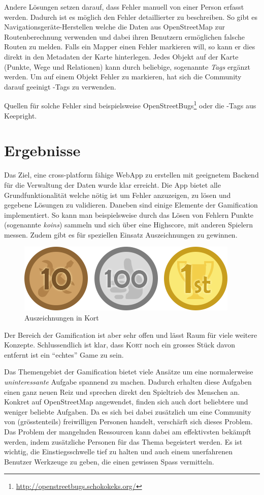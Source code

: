Andere Lösungen setzen darauf, dass Fehler manuell von einer Person erfasst werden. Dadurch ist es möglich den Fehler detaillierter zu beschreiben. 
So gibt es Navigationsgeräte-Herstellen welche die Daten aus OpenStreetMap zur Routenberechnung verwenden und dabei ihren Benutzern ermöglichen falsche Routen zu melden.
Falls ein \gls{Mapper} einen Fehler markieren will, so kann er dies direkt in den Metadaten der Karte hinterlegen. Jedes Objekt auf der Karte (Punkte, Wege und Relationen) kann durch beliebige, sogenannte  \emph{Tags} ergänzt werden.
Um auf einem Objekt Fehler zu markieren, hat sich die Community darauf geeinigt -Tags zu verwenden.

Quellen für solche Fehler sind beispielsweise OpenStreetBugs\footnote{\url{http://openstreetbugs.schokokeks.org/}} oder die -Tags aus Keepright.

\section*{Ergebnisse}
Das Ziel, eine cross-platform fähige \gls{WebApp} zu erstellen mit geeignetem Backend für die Verwaltung der Daten wurde klar erreicht.
Die App bietet alle Grundfunktionalität welche nötig ist um Fehler anzuzeigen, zu lösen und gegebene Lösungen zu validieren.
Daneben sind einige Elemente der Gamification implementiert. So kann man beispielsweise durch das Lösen von Fehlern Punkte (sogenannte \emph{koins}) sammeln und sich über eine Highscore, mit anderen Spielern messen.
Zudem gibt es für speziellen Einsatz Auszeichnungen zu gewinnen.

\begin{figure}[H]
	\centering
	\includegraphics[scale=0.6]{images/gamification/gamification-badges}
	\caption{Auszeichnungen in Kort}
	\label{image-kort-badges}
\end{figure}

Der Bereich der Gamification ist aber sehr offen und lässt Raum für viele weitere Konzepte. Schlussendlich ist klar, dass \textsc{Kort} noch ein grosses Stück davon entfernt ist ein "`echtes"' Game zu sein.

Das Themengebiet der Gamification bietet viele Ansätze um eine normalerweise \emph{uninteressante} Aufgabe spannend zu machen.
Dadurch erhalten diese Aufgaben einen ganz neuen Reiz und sprechen direkt den Spieltrieb des Menschen an.
Konkret auf OpenStreetMap angewendet, finden sich auch dort beliebtere und weniger beliebte Aufgaben.
Da es sich bei dabei zusätzlich um eine Community von (grösstenteils) freiwilligen Personen handelt, verschärft sich dieses Problem.
Das Problem der mangelnden Ressourcen kann dabei am effektivsten bekämpft werden, indem zusätzliche Personen für das Thema begeistert werden.
Es ist wichtig, die Einstiegsschwelle tief zu halten und auch einem unerfahrenen Benutzer Werkzeuge zu geben, die einen gewissen Spass vermitteln.

